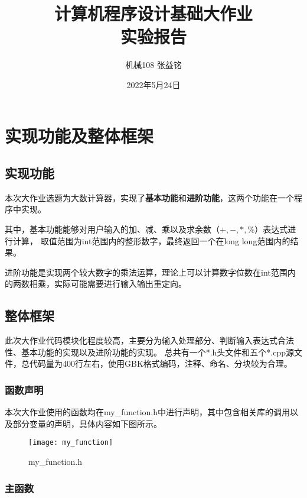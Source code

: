 \documentclass[a4paper, 11pt, UTF8]{ctexart}
\title{计算机程序设计基础大作业\\实验报告}
\author{机械108 \qquad 张益铭 \qquad 2021010552}
\date{2022年5月24日}
\begin{document}
\maketitle

\tableofcontents


\newpage

\section{实现功能及整体框架}

\subsection{实现功能}

本次大作业选题为大数计算器，实现了\textbf{基本功能}和\textbf{进阶功能}，这两个功能在一个程序中实现。

其中，基本功能能够对用户输入的加、减、乘以及求余数（$+, -, *, \% $）表达式进行计算，
取值范围为int范围内的整形数字，最终返回一个在long long范围内的结果。

进阶功能是实现两个较大数字的乘法运算，理论上可以计算数字位数在int范围内的两数相乘，实际可能需要进行输入输出重定向。

\subsection{整体框架}

此次大作业代码模块化程度较高，主要分为输入处理部分、判断输入表达式合法性、基本功能的实现以及进阶功能的实现。
总共有一个*.h头文件和五个*.cpp源文件，总代码量为400行左右，使用GBK格式编码，注释、命名、分块较为合理。

\subsubsection{函数声明}

本次大作业使用的函数均在my\_function.h中进行声明，其中包含相关库的调用以及部分变量的声明，具体内容如下图所示。

\begin{figure}[H]
    \centering
    \texttt{[image: my\_function]}
    \caption{my\_function.h}
\end{figure}

\subsubsection{主函数}
\end{document}
